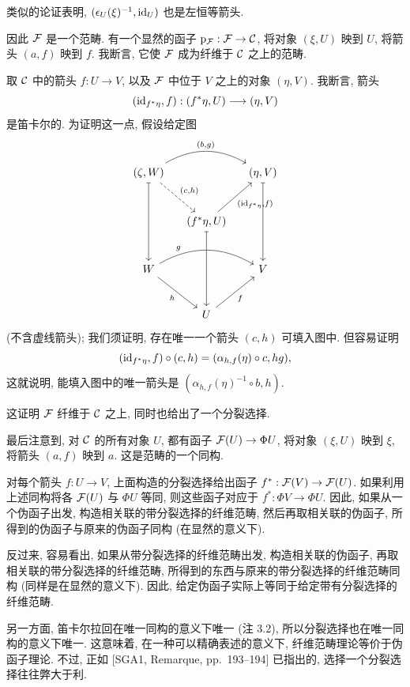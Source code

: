 类似的论证表明, $(\epsilon_U(\xi)^{-1},\mathrm{id}_U)$ 也是左恒等箭头.

因此 $\mathcal F$ 是一个范畴. 有一个显然的函子 $\mathrm p_{\mathcal F}:\mathcal F\to\mathcal C$, 将对象 $(\xi,U)$ 映到 $U$, 将箭头 $(a,f)$ 映到 $f$. 我断言, 它使 $\mathcal F$ 成为纤维于 $\mathcal C$ 之上的范畴.

取 $\mathcal C$ 中的箭头 $f:U\to V$, 以及 $\mathcal F$ 中位于 $V$ 之上的对象 $(\eta,V)$. 我断言, 箭头
\[
(\mathrm{id}_{f^*\eta},f):(f^*\eta,U)\longrightarrow(\eta,V)
\]
是笛卡尔的. 为证明这一点, 假设给定图
\[
\begin{tikzcd}[column sep=small,row sep=large]
(\zeta,W)\arrow[rr,bend left,"{(b,g)}"]\arrow[dr,dashed,"{(c,h)}"]\arrow[dd,mapsto]&&(\eta,V)\arrow[dd,mapsto]\\
&(f^*\eta,U)\arrow[ur,"{(\id_{f^*\eta},f)}"']\arrow[dd,mapsto]&\\
W\arrow[rr,bend left,"{g}" pos=0.25]\arrow[dr,"{h}"']&&V\\
&U\arrow[ur,"{f}"']&
\end{tikzcd}
\]
(不含虚线箭头); 我们须证明, 存在唯一一个箭头 $(c,h)$ 可填入图中. 但容易证明
\[
(\mathrm{id}_{f^*\eta},f)\circ(c,h)
=(\alpha_{h,f}(\eta)\circ c,hg),
\]
这就说明, 能填入图中的唯一箭头是 $(\alpha_{h,f}(\eta)^{-1}\circ b,h)$.

这证明 $\mathcal F$ 纤维于 $\mathcal C$ 之上, 同时也给出了一个分裂选择.

最后注意到, 对 $\mathcal C$ 的所有对象 $U$, 都有函子 $\mathcal F(U)\to\Phi U$, 将对象 $(\xi,U)$ 映到 $\xi$, 将箭头 $(a,f)$ 映到 $a$. 这是范畴的一个同构.

对每个箭头 $f:U\to V$, 上面构造的分裂选择给出函子 $f^*:\mathcal F(V)\to\mathcal F(U)$. 如果利用上述同构将各 $\mathcal F(U)$ 与 $\Phi U$ 等同, 则这些函子对应于 $f^*:\Phi V\to\Phi U$. 因此, 如果从一个伪函子出发, 构造相关联的带分裂选择的纤维范畴, 然后再取相关联的伪函子, 所得到的伪函子与原来的伪函子同构 (在显然的意义下).

反过来, 容易看出, 如果从带分裂选择的纤维范畴出发, 构造相关联的伪函子, 再取相关联的带分裂选择的纤维范畴, 所得到的东西与原来的带分裂选择的纤维范畴同构 (同样是在显然的意义下).
因此, 给定伪函子实际上等同于给定带有分裂选择的纤维范畴.

另一方面, 笛卡尔拉回在唯一同构的意义下唯一 (注 3.2), 所以分裂选择也在唯一同构的意义下唯一. 这意味着, 在一种可以精确表述的意义下, 纤维范畴理论等价于伪函子理论. 不过, 正如 [SGA1, Remarque, pp.~193--194] 已指出的, 选择一个分裂选择往往弊大于利.

